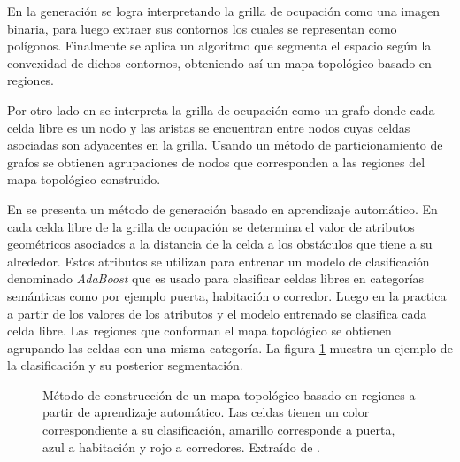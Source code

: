 En \cite{Fermin-Leon2017} la generación se logra interpretando la grilla de
ocupación como una imagen binaria, para luego extraer sus contornos los cuales
se representan como polígonos. Finalmente se aplica un algoritmo que segmenta
el espacio según la convexidad de dichos contornos, obteniendo así un mapa
topológico basado en regiones.

Por otro lado en \cite{zivkovic2006hierarchical} se interpreta la grilla de
ocupación como un grafo donde cada celda libre es un nodo y las aristas se
encuentran entre nodos cuyas celdas asociadas son adyacentes en la grilla.
Usando un método de particionamiento de grafos se obtienen agrupaciones de
nodos que corresponden a las regiones del mapa topológico construido.

En \cite{martinez2006semantic} se presenta un método de generación basado en
aprendizaje automático. En cada celda libre de la grilla de ocupación se
determina el valor de atributos geométricos asociados a la distancia de la
celda a los obstáculos que tiene a su alrededor. Estos atributos se utilizan
para entrenar un modelo de clasificación denominado \emph{AdaBoost}
\cite{schapire1999improved} que es usado para clasificar celdas libres en
categorías semánticas como por ejemplo puerta, habitación o corredor. Luego en
la practica a partir de los valores de los atributos y el modelo entrenado se
clasifica cada celda libre. Las regiones que conforman el mapa topológico se
obtienen agrupando las celdas con una misma categoría. La figura
\ref{fig:ejMartinezTop} muestra un ejemplo de la clasificación y su posterior
segmentación.

\begin{figure}[H]
  \centering
  \qquad
  \caption[Método de construcción de un mapa topológico basado en regiones a partir de aprendizaje automático.]{Método de construcción de un mapa topológico basado en regiones a partir de aprendizaje automático. Las celdas tienen un color correspondiente a su clasificación, amarillo corresponde a puerta, azul a habitación y rojo a corredores. Extraído de \cite{martinez2006semantic}.}\label{fig:ejMartinezTop}
\end{figure}

